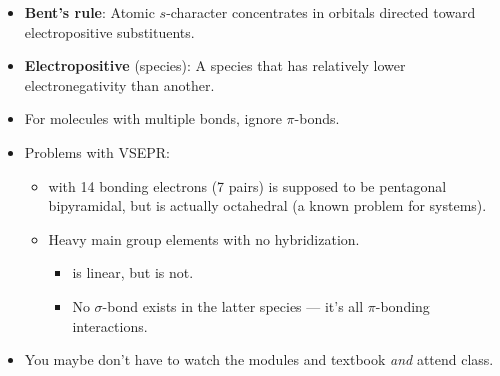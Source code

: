 \documentclass[../notes.tex]{subfiles}
\begin{document}
\begin{itemize}
\begin{itemize}
    \end{itemize}
    \item \textbf{Bent's rule}: Atomic $s$-character concentrates in orbitals directed toward electropositive substituents.
    \item \textbf{Electropositive} (species): A species that has relatively lower electronegativity than another.
    \item For molecules with multiple bonds, ignore $\pi$-bonds.
    \item Problems with VSEPR:
    \begin{itemize}
        \item {} with 14 bonding electrons (7 pairs) is supposed to be pentagonal bipyramidal, but is actually octahedral (a known problem for  systems).
        \item Heavy main group elements with no hybridization.
        \begin{itemize}
            \item {} is linear, but  is not.
            \item No $\sigma$-bond exists in the latter species --- it's all $\pi$-bonding interactions.
        \end{itemize}
    \end{itemize}
    \item You maybe don't have to watch the modules and textbook \emph{and} attend class.
\end{itemize}
\end{document}
